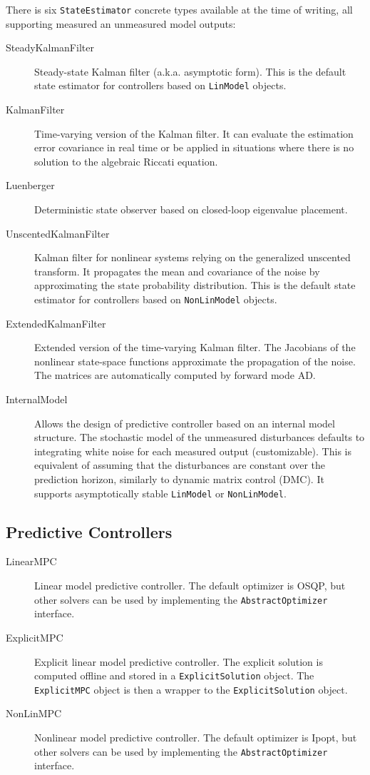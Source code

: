 There is six \texttt{StateEstimator} concrete types available at the time of writing, all supporting measured an unmeasured model outputs:
\begin{description}
    \item[SteadyKalmanFilter] Steady-state Kalman filter (a.k.a. asymptotic form). This is the default state estimator for controllers based on \texttt{LinModel} objects.
    \item[KalmanFilter] Time-varying version of the Kalman filter. It can evaluate the estimation error covariance in real time or be applied in situations where there is no solution to the algebraic Riccati equation.
    \item[Luenberger] Deterministic state observer based on closed-loop eigenvalue placement.
    \item[UnscentedKalmanFilter] Kalman filter for nonlinear systems relying on the generalized unscented transform. It propagates the mean and covariance of the noise by approximating the state probability distribution. This is the default state estimator for controllers based on \texttt{NonLinModel} objects.
    \item[ExtendedKalmanFilter] Extended version of the time-varying Kalman filter. The Jacobians of the nonlinear state-space functions approximate the propagation of the noise. The matrices are automatically computed by forward mode AD.
    \item[InternalModel] Allows the design of predictive controller based on an internal model structure. The stochastic model of the unmeasured disturbances defaults to integrating white noise for each measured output (customizable). This is equivalent of assuming that the disturbances are constant over the prediction horizon, similarly to dynamic matrix control (DMC). It supports asymptotically stable \texttt{LinModel} or \texttt{NonLinModel}.
\end{description}

\subsection{Predictive Controllers}

\begin{description}
    \item[LinearMPC] Linear model predictive controller. The default optimizer is OSQP, but other solvers can be used by implementing the \texttt{AbstractOptimizer} interface.
    \item[ExplicitMPC] Explicit linear model predictive controller. The explicit solution is computed offline and stored in a \texttt{ExplicitSolution} object. The \texttt{ExplicitMPC} object is then a wrapper to the \texttt{ExplicitSolution} object.
    \item[NonLinMPC] Nonlinear model predictive controller. The default optimizer is Ipopt, but other solvers can be used by implementing the \texttt{AbstractOptimizer} interface. 
\end{description}

